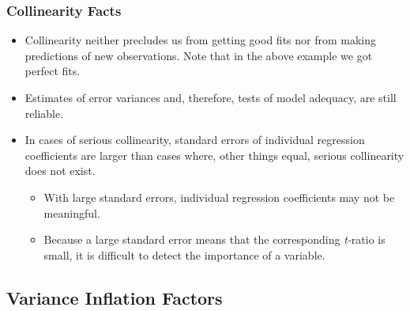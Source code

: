 \begin{frame}%
 \frametitle{Collinearity Facts}

\begin{itemize}
\item Collinearity neither precludes us from
getting good fits nor from making predictions of new observations.
Note that in the above example we got perfect fits.

\item  Estimates of error variances and, therefore, tests of model adequacy, are
still reliable.

\item  In cases of serious collinearity, standard errors of individual
regression coefficients are larger than cases where, other things
equal, serious collinearity does not exist.
\begin{itemize}
\item With large standard
errors, individual regression coefficients may not be meaningful.
\item Because a large standard error means that the corresponding
\textit{t-}ratio is small, it is difficult to detect the importance
of a variable.
\end{itemize}\end{itemize}
\end{frame}


\subsection{Variance Inflation Factors}

